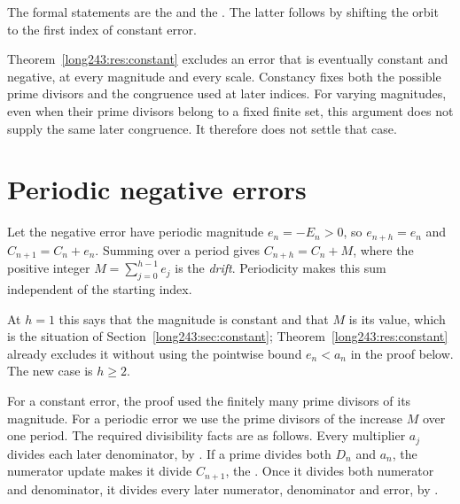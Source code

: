 \noindent The formal statements are the
 and the
. The latter follows by shifting the orbit to the first index
of constant error.

Theorem~\ref{long243:res:constant} excludes an error that is eventually constant
and negative, at every magnitude and every scale. Constancy fixes both
the possible prime divisors and the congruence used at later indices.
For varying magnitudes, even when their prime divisors belong to a fixed
finite set, this argument does not supply the same later congruence.
It therefore does not settle that case.

\section{Periodic negative errors}\label{long243:sec:periodic}

Let the negative error have periodic magnitude $e_n=-E_n>0$, so
$e_{n+h}=e_n$ and $C_{n+1}=C_n+e_n$. Summing over a period gives
$C_{n+h}=C_n+M$, where the positive integer
$M=\sum_{j=0}^{h-1}e_j$ is the \emph{drift}. Periodicity makes this
sum independent of the starting index.

At $h=1$ this says that the magnitude is constant and that $M$ is its value,
which is the situation of Section~\ref{long243:sec:constant};
Theorem~\ref{long243:res:constant} already excludes it without using
the pointwise bound $e_n<a_n$ in the proof below. The new case is $h\ge2$.

For a constant error, the proof used the finitely many prime divisors of
its magnitude. For a periodic error we use the prime divisors of the
increase $M$ over one period. The required divisibility facts are as
follows. Every multiplier $a_j$ divides each later denominator, by
. If a prime divides both $D_n$ and $a_n$, the numerator
update makes it divide $C_{n+1}$, the
. Once it divides both numerator and denominator,
it divides every later numerator, denominator and error, by
.


